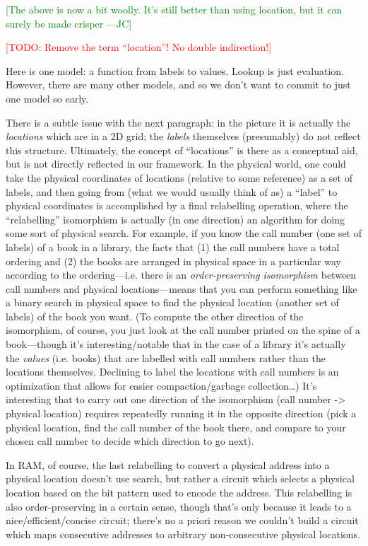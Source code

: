 \documentclass{jfp1}
\newcommand{\authornote}[3]{\textcolor{#1}{[#3 ---#2]}}
\newcommand{\todo}[1]{\textcolor{red}{[TODO: #1]}}
\newcommand{\authornote}[3]{}
\newcommand{\todo}[1]{}
\newcommand{\jc}[1]{\authornote{green}{JC}{#1}}  %
\begin{document}
\jc{The above is now a bit woolly. It's still better than
using location, but it can surely be made crisper}

\todo{Remove the term ``location''! No double indirection!}

Here is one model: a function from labels to values.  Lookup is just evaluation. 
However, there are many other models, and so we don't want to commit
to just one model so early.

\begin{commentary}
  There is a subtle issue with the next paragraph: in the picture it
  is actually the \emph{locations} which are in a 2D grid; the
  \emph{labels} themselves (presumably) do not reflect this structure.
  Ultimately, the concept of ``locations'' is there as a conceptual
  aid, but is not directly reflected in our framework.  In the
  physical world, one could take the physical coordinates of locations
  (relative to some reference) as a set of labels, and then going from
  (what we would usually think of as) a ``label'' to physical
  coordinates is accomplished by a final relabelling operation, where
  the ``relabelling'' isomorphism is actually (in one direction) an
  algorithm for doing some sort of physical search.  For example, if
  you know the call number (one set of labels) of a book in a library,
  the facts that (1) the call numbers have a total ordering and (2)
  the books are arranged in physical space in a particular way
  according to the ordering---i.e. there is an \emph{order-preserving
    isomorphism} between call numbers and physical locations---means
  that you can perform something like a binary search in physical
  space to find the physical location (another set of labels) of the
  book you want.  (To compute the other direction of the isomorphism,
  of course, you just look at the call number printed on the spine of
  a book---though it's interesting/notable that in the case of a
  library it's actually the \emph{values} (i.e. books) that are
  labelled with call numbers rather than the locations themselves.
  Declining to label the locations with call numbers is an
  optimization that allows for easier compaction/garbage
  collection\dots) It's interesting that to carry out one direction of
  the isomorphism (call number -> physical location) requires
  repeatedly running it in the opposite direction (pick a physical
  location, find the call number of the book there, and compare to
  your chosen call number to decide which direction to go next).

  In RAM, of course, the last relabelling to convert a physical
  address into a physical location doesn't use search, but rather a
  circuit which selects a physical location based on the bit pattern
  used to encode the address.  This relabelling is also
  order-preserving in a certain sense, though that's only because it
  leads to a nice/efficient/concise circuit; there's no a priori
  reason we couldn't build a circuit which maps consecutive addresses
  to arbitrary non-consecutive physical locations.
\end{commentary}
\end{document}
